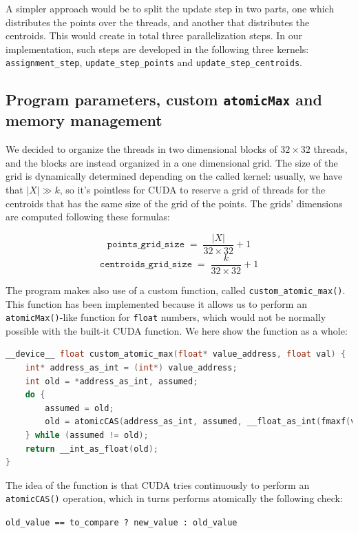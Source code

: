 \documentclass[11pt, journal]{IEEEtran}
\newcommand{\nwl}{

\vspace{11pt}

}
\begin{document}
A simpler approach would be to split the update step in two parts, one which distributes the points over the threads, and another that distributes the centroids. This would create in total three parallelization steps. In our implementation, such steps are developed in the following three kernels: \verb|assignment_step|, \verb|update_step_points| and \verb|update_step_centroids|.

\subsection{Program parameters, custom \texttt{atomicMax} and memory management}

We decided to organize the threads in two dimensional blocks of $32 \times 32$ threads, and the blocks are instead organized in a one dimensional grid. The size of the grid is dynamically determined depending on the called kernel: usually, we have that $|X| \gg k$, so it's pointless for CUDA to reserve a grid of threads for the centroids that has the same size of the grid of the points. The grids' dimensions are computed following these formulas:

\[ \texttt{points\_grid\_size} \; = \; \frac{\left| X \right|}{32 \times 32} + 1 \]
\[ \texttt{centroids\_grid\_size} \; = \; \frac{k}{32 \times 32} + 1 \]

The program makes also use of a custom function, called \verb|custom_atomic_max()|. This function has been implemented because it allows us to perform an \verb|atomicMax()|-like function for \verb|float| numbers, which would not be normally possible with the built-it CUDA function. We here show the function as a whole:
\nwl
\begin{lstlisting}[language = C]
__device__ float custom_atomic_max(float* value_address, float val) {
    int* address_as_int = (int*) value_address;
    int old = *address_as_int, assumed;
    do {
        assumed = old;
        old = atomicCAS(address_as_int, assumed, __float_as_int(fmaxf(val, __int_as_float(assumed))));
    } while (assumed != old);
    return __int_as_float(old);
}\end{lstlisting}
\nwl
The idea of the function is that CUDA tries continuously to perform an \verb|atomicCAS()| operation, which in turns performs atomically the following check:
\begin{center}
    \scriptsize
    \verb|old_value == to_compare ? new_value : old_value|
\end{center}
\end{document}
